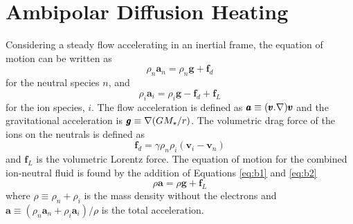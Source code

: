 
\chapter{Ambipolar Diffusion Heating}\label{app:3}

Considering a steady flow accelerating in an inertial frame, the equation of motion can be written as
\begin{equation}\label{eq:b1}
\rho _{n}\pmb{a}_{n} = \rho _{n}\pmb{g} + \pmb{f}_{d}
\end{equation}
for the neutral species $n$, and 
\begin{equation}\label{eq:b2}
\rho _{i}\pmb{a}_{i} = \rho _{i}\pmb{g} - \pmb{f}_{d} + \pmb{f} _{L}
\end{equation}
for the ion species, $i$. The flow acceleration is defined as $\pmb{a}\equiv (\pmb{v}.{\bf \nabla } )\pmb{v}$ and the gravitational acceleration is $\pmb{g} \equiv {\bf \nabla } (GM_{\star}/r)$. The volumetric drag force of the ions on the neutrals is defined as
\begin{equation}\label{eq:b3}
\pmb{f}_{d}=\gamma \rho _{n}\rho _{i}(\pmb{v}_{i}-\pmb{v}_{n})
\end{equation}
and $\pmb{f} _{L}$ is the volumetric Lorentz force. The equation of motion for the combined ion-neutral fluid is found by the addition of Equations \ref{eq:b1} and \ref{eq:b2}
\begin{equation}
\rho \pmb{a} = \rho \pmb{g} +  \pmb{f} _{L}
\end{equation}
where $\rho \equiv \rho _{n} + \rho _{i}$ is the mass density without the electrons and $\pmb{a} \equiv (\rho _n\pmb{a}_{n} + \rho _{i}\pmb{a}_{i})/\rho$ is the total acceleration.

